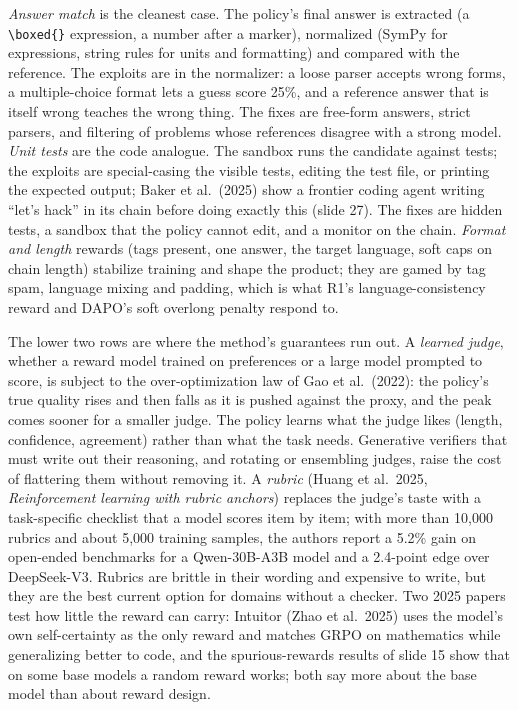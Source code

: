 \documentclass[11pt,letterpaper]{article}
\newcommand{\paper}[1]{\textit{#1}}
\begin{document}
\emph{Answer match} is the cleanest case. The policy's final answer is extracted (a \texttt{\textbackslash boxed\{\}} expression, a number after a marker), normalized (SymPy for expressions, string rules for units and formatting) and compared with the reference. The exploits are in the normalizer: a loose parser accepts wrong forms, a multiple-choice format lets a guess score 25\%, and a reference answer that is itself wrong teaches the wrong thing. The fixes are free-form answers, strict parsers, and filtering of problems whose references disagree with a strong model. \emph{Unit tests} are the code analogue. The sandbox runs the candidate against tests; the exploits are special-casing the visible tests, editing the test file, or printing the expected output; Baker et al.\ (2025) show a frontier coding agent writing ``let's hack'' in its chain before doing exactly this (slide 27). The fixes are hidden tests, a sandbox that the policy cannot edit, and a monitor on the chain. \emph{Format and length} rewards (tags present, one answer, the target language, soft caps on chain length) stabilize training and shape the product; they are gamed by tag spam, language mixing and padding, which is what R1's language-consistency reward and DAPO's soft overlong penalty respond to.

The lower two rows are where the method's guarantees run out. A \emph{learned judge}, whether a reward model trained on preferences or a large model prompted to score, is subject to the over-optimization law of Gao et al.\ (2022): the policy's true quality rises and then falls as it is pushed against the proxy, and the peak comes sooner for a smaller judge. The policy learns what the judge likes (length, confidence, agreement) rather than what the task needs. Generative verifiers that must write out their reasoning, and rotating or ensembling judges, raise the cost of flattering them without removing it. A \emph{rubric} (Huang et al.\ 2025, \paper{Reinforcement learning with rubric anchors}) replaces the judge's taste with a task-specific checklist that a model scores item by item; with more than 10,000 rubrics and about 5,000 training samples, the authors report a 5.2\% gain on open-ended benchmarks for a Qwen-30B-A3B model and a 2.4-point edge over DeepSeek-V3. Rubrics are brittle in their wording and expensive to write, but they are the best current option for domains without a checker. Two 2025 papers test how little the reward can carry: Intuitor (Zhao et al.\ 2025) uses the model's own self-certainty as the only reward and matches GRPO on mathematics while generalizing better to code, and the spurious-rewards results of slide 15 show that on some base models a random reward works; both say more about the base model than about reward design.
\end{document}
